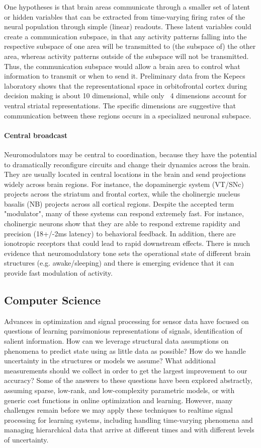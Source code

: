 \documentclass[12pt]{report}
\begin{document}
One hypotheses is that brain areas communicate through a smaller set of latent
or hidden variables that can be extracted from time-varying firing rates of
the neural population through simple (linear) readouts. These latent variables
could create a communication subspace, in that any activity patterns falling
into the respective subspace of one area will be transmitted to (the subspace
of) the other area, whereas activity patterns outside of the subspace will not
be transmitted. Thus, the communication subspace would allow a brain area to
control what information to transmit or when to send it. Preliminary data from
the Kepecs laboratory shows that the representational space in orbitofrontal
cortex during decision making is about 10 dimensional, while only ~4 dimensions
account for ventral striatal representations. The specific dimensions are
suggestive that communication between these regions occurs in a specialized
neuronal subspace.

\paragraph*{Central broadcast}
Neuromodulators may be central to coordination, because they have the potential
to dramatically reconfigure circuits and change their dynamics across the brain.
They are usually located in central locations in the brain and send projections
widely across brain regions. For instance, the dopaminergic system (VT/SNc)
projects across the striatum and frontal cortex, while the cholinergic nucleus
basalis (NB) projects across all cortical regions. Despite the accepted term
"modulator", many of these systems can respond extremely fast. For instance,
cholinergic neurons show that they are able to respond extreme rapidity and
precision (18+/-2ms latency) to behavioral feedback. In addition, there are
ionotropic receptors that could lead to rapid downstream effects. There is
much evidence that neuromodulatory tone sets the operational state of different
brain structures (e.g. awake/sleeping) and there is emerging evidence that it
can provide fast modulation of activity.

\subsection{Computer Science}
Advances in optimization and signal processing for sensor data have focused on questions of learning parsimonious representations of signals, identification of salient information. How can we leverage structural data assumptions on phenomena to predict state using as little data as possible? How do we handle uncertainty in the structures or models we assume? What additional measurements should we collect in order to get the largest improvement to our accuracy? Some of the answers to these questions have been explored abstractly, assuming sparse, low-rank, and low-complexity parametric models, or with generic cost functions in online optimization and learning. However, many challenges remain before we may apply these techniques to realtime signal processing for learning systems, including handling time-varying phenomena and managing hierarchical data that arrive at different times and with different levels of uncertainty.
\end{document}
